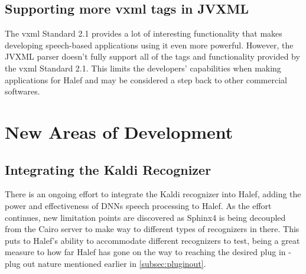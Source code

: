 \subsection{Supporting more \ac{vxml} tags in JVXML}
The \ac{vxml} Standard 2.1 \cite{vxmlstd} provides a lot of interesting functionality that makes developing speech-based applications using it even more powerful.
However, the JVXML parser doesn't fully support all of the tags and functionality provided by the \ac{vxml} Standard 2.1.
This limits the developers' capabilities when making applications for Halef and may be considered a step back to other commercial softwares.
\section{New Areas of Development}

\subsection{Integrating the Kaldi Recognizer}
There is an ongoing effort to integrate the Kaldi recognizer into Halef, adding the power and effectiveness of DNNs speech processing to Halef.
As the effort continues, new limitation points are discovered as Sphinx4 is being decoupled from the Cairo server to make way to different types of recognizers in there.
This puts to Halef's ability to accommodate different recognizers to test, being a great measure to how far Halef has gone on the way to reaching the desired plug in - plug out nature mentioned earlier in \ref{subsec:pluginout}.

